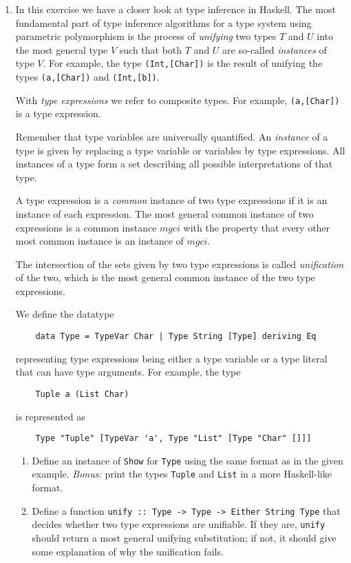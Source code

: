 \documentclass{article}
\def\code#1{\texttt{#1}}
\begin{document}
\begin{enumerate}
    \item \cite[p. 314]{thompson} In this exercise we have a closer look at type inference in Haskell. The most fundamental part of type inference algorithms for a type system using parametric polymorphism is the process of \textit{unifying} two types $T$ and $U$ into the most general type $V$ such that both $T$ and $U$ are so-called \textit{instances} of type $V$. For example, the type \code{(Int,[Char])} is the result of unifying the types \code{(a,[Char])} and \code{(Int,[b])}. \par
        With \textit{type expressions} we refer to composite types. For example, \code{(a,[Char])} is a type expression. \par
        Remember that type variables are universally quantified. An \textit{instance} of a type is given by replacing a type variable or variables by type expressions. All instances of a type form a set describing all possible interpretations of that type. \par
        A type expression is a \textit{common} instance of two type expressions if it is an instance of each expression. The most general common instance of two expressions is a common instance $mgci$ with the property that every other most common instance is an instance of $mgci$. \par
        The intersection of the sets given by two type expressions is called \textit{unification} of the two, which is the most general common instance of the two type expressions. \par
        We define the datatype
        \begin{verbatim}
    data Type = TypeVar Char | Type String [Type] deriving Eq
        \end{verbatim}
        representing type expressions being either a type variable or a type literal that can have type arguments. For example, the type
        \begin{verbatim}
    Tuple a (List Char)
        \end{verbatim}
        is represented as
        \begin{verbatim}
    Type "Tuple" [TypeVar 'a', Type "List" [Type "Char" []]]
        \end{verbatim}
        \begin{enumerate}
            \item Define an instance of \code{Show} for \code{Type} using the same format as in the given example. \textit{Bonus:} print the types \code{Tuple} and \code{List} in a more Haskell-like format.
            \item Define a function \code{unify :: Type -> Type -> Either String Type} that decides whether two type expressions are unifiable. If they are, \code{unify} should return a most general unifying substitution; if not, it should give some explanation of why the unification fails.
        \end{enumerate}
\end{enumerate}
\end{document}

